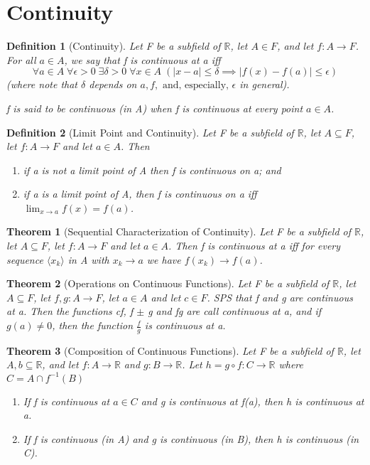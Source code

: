 \documentclass[11pt, oneside]{book}
\theoremstyle{break}
\newtheorem{thm}{Theorem}[section]
\newtheorem{defn}{Definition}[section]
\newcommand{\bb}[1]{\mathbb{#1}}		%
\begin{document}
\section{Continuity}

\begin{defn}[Continuity]
	Let F be a subfield of $\bb{R}$, let $A \in F$, and let $f: A \to F$. For all $a \in A$, we say that f is continuous at a iff
	\[
		\forall a \in A \; \forall \epsilon > 0 \; \exists \delta > 0 \; \forall x \in A \; (|x - a| \leq \delta \implies |f(x) - f(a)| \leq \epsilon)
	\]
	(where note that $\delta$ depends on $a, f, \text{ and, especially, } \epsilon$ in general).

	f is said to be continuous (in A) when f is continuous at every point $a \in A$.
\end{defn}

\begin{defn}[Limit Point and Continuity]
	Let F be a subfield of $\bb{R}$, let $A \subseteq F$, let $f: A \to F$ and let $a \in A$. Then
	\begin{enumerate}
		\item if a is not a limit point of A then f is continuous on a; and
		\item if a is a limit point of A, then f is continuous on a iff $\lim_{x \to a} f(x) = f(a)$.
	\end{enumerate}
\end{defn}

\begin{thm}[Sequential Characterization of Continuity]
	Let F be a subfield of $\bb{R}$, let $A \subseteq F$, let $f: A \to F$ and let $a \in A$. Then f is continuous at a iff for every sequence $\langle x_k \rangle$ in A with $x_k \to a$ we have $f(x_k) \to f(a)$.
\end{thm}

\begin{thm}[Operations on Continuous Functions]
	Let F be a subfield of $\bb{R}$, let $A \subseteq F$, let $f, g: A \to F$, let $a \in A$ and let $c \in F$. SPS that f and g are continuous at a. Then the functions cf, f $\pm$ g and fg are call continuous at a, and if $g(a) \neq 0$, then the function $\frac{f}{g}$ is continuous at a.
\end{thm}

\begin{thm}[Composition of Continuous Functions]
	Let F be a subfield of $\bb{R}$, let $A, b \subseteq \bb{R}$, and let $f: A \to \bb{R}$ and $g: B \to \bb{R}$. Let $h = g \circ f : C \to \bb{R}$ where $C = A \cap f^{-1}(B)$
	\begin{enumerate}
		\item If f is continuous at $a \in C$ and g is continuous at f(a), then h is continuous at a.
		\item If f is continuous (in A) and g is continuous (in B), then h is continuous (in C).
	\end{enumerate}
\end{thm}
\end{document}
